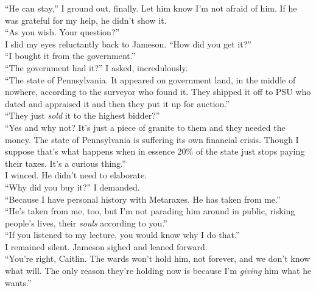 \documentclass[a5paper]{scrartcl}
\begin{document}
\enquote{He can stay,} I ground out, finally. Let him know I'm not afraid of him. If he was grateful for my help, he didn't show it.\\


\enquote{As you wish. Your question?}\\


I slid my eyes reluctantly back to Jameson. \enquote{How did you get it?}\\


\enquote{I bought it from the government.}\\


\enquote{The government had it?} I asked, incredulously.\\


\enquote{The state of Pennsylvania. It appeared on government land, in the middle of nowhere, according to the surveyor who found it. They shipped it off to PSU who dated and appraised it and then they put it up for auction.}\\


\enquote{They just \textit{sold} it to the highest bidder?}\\


\enquote{Yes and why not? It's just a piece of granite to them and they needed the money. The state of Pennsylvania is suffering its own financial crisis. Though I suppose that's what happens when in essence 20\% of the state just stops paying their taxes. It's a curious thing.}\\


I winced. He didn't need to elaborate.\\


\enquote{Why did you buy it?} I demanded.\\


\enquote{Because I have personal history with Metaraxes. He has taken from me.}\\


\enquote {He's taken from me, too, but I'm not parading him around in public, risking people's lives, their \textit{souls} according to you.}\\


\enquote{If you listened to my lecture, you would know why I do that.}\\


I remained silent. Jameson sighed and leaned forward.\\


\enquote{You're right, Caitlin. The wards won't hold him, not forever, and we don't know what will. The only reason they're holding now is because I'm \textit{giving} him what he wants.}\\
\end{document}
